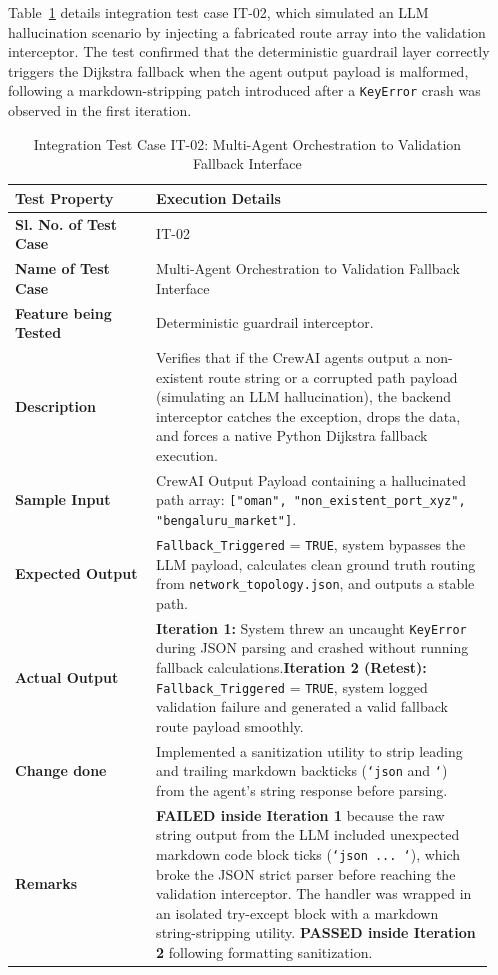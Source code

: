 Table~\ref{tab:it02} details integration test case IT-02, which simulated an LLM hallucination scenario by injecting a fabricated route array into the validation interceptor. The test confirmed that the deterministic guardrail layer correctly triggers the Dijkstra fallback when the agent output payload is malformed, following a markdown-stripping patch introduced after a \texttt{KeyError} crash was observed in the first iteration.

\begin{table}[H]
    \centering
    \caption{Integration Test Case IT-02: Multi-Agent Orchestration to Validation Fallback Interface}
    \label{tab:it02}
    \begin{tabular}{|p{0.28\linewidth}|p{0.67\linewidth}|}
        \hline
        \textbf{Test Property} & \textbf{Execution Details} \\ \hline
        \textbf{Sl. No. of Test Case} & IT-02 \\ \hline
        \textbf{Name of Test Case} & Multi-Agent Orchestration to Validation Fallback Interface \\ \hline
        \textbf{Feature being Tested} & Deterministic guardrail interceptor. \\ \hline
        \textbf{Description} & Verifies that if the CrewAI agents output a non-existent route string or a corrupted path payload (simulating an LLM hallucination), the backend interceptor catches the exception, drops the data, and forces a native Python Dijkstra fallback execution. \\ \hline
        \textbf{Sample Input} & CrewAI Output Payload containing a hallucinated path array: \texttt{["oman", "non\_existent\_port\_xyz", "bengaluru\_market"]}. \\ \hline
        \textbf{Expected Output} & \texttt{Fallback\_Triggered} = \texttt{TRUE}, system bypasses the LLM payload, calculates clean ground truth routing from \texttt{network\_topology.json}, and outputs a stable path. \\ \hline
        \textbf{Actual Output} & \textbf{Iteration 1:} System threw an uncaught \texttt{KeyError} during JSON parsing and crashed without running fallback calculations.\newline \textbf{Iteration 2 (Retest):} \texttt{Fallback\_Triggered} = \texttt{TRUE}, system logged validation failure and generated a valid fallback route payload smoothly. \\ \hline
        \textbf{Change done} & Implemented a sanitization utility to strip leading and trailing markdown backticks (\texttt{`json} and \texttt{`}) from the agent's string response before parsing. \\ \hline
        \textbf{Remarks} & \textbf{FAILED inside Iteration 1} because the raw string output from the LLM included unexpected markdown code block ticks (\texttt{`json ... `}), which broke the JSON strict parser before reaching the validation interceptor. The handler was wrapped in an isolated try-except block with a markdown string-stripping utility. \textbf{PASSED inside Iteration 2} following formatting sanitization. \\ \hline
    \end{tabular}
\end{table}



